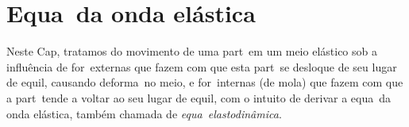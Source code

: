 
\chapter{Equa\cao\ da onda el\'astica}

Neste Cap\itulo, tratamos do movimento de uma part\icula\ em um meio
el\'astico sob a influ\^encia de for\cas\ externas que fazem com que esta
part\icula\ se desloque de seu lugar de equil\ibrio, causando
deforma\coes\ no meio, e for\cas\ internas
(de mola) que fazem com que a part\icula\ tende a voltar ao seu lugar de
equil\ibrio, com o intuito de derivar a equa\cao\ da onda el\'astica,
tamb\'em chamada de {\it equa\cao\ elastodin\^amica}.
